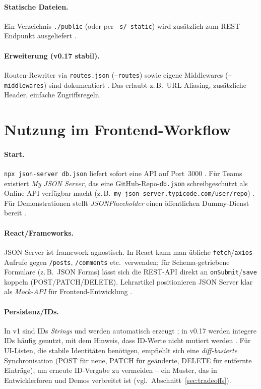 \documentclass[11pt,a4paper]{article}
\begin{document}
\paragraph{Statische Dateien.} Ein Verzeichnis \texttt{./public} (oder per \texttt{-s/--static}) wird zusätzlich zum REST-Endpunkt ausgeliefert \cite[Abschnitt \enquote{Serving static files}]{jsonserver-github-v1}. 

\paragraph{Erweiterung (v0.17 stabil).} Routen-Rewriter via \texttt{routes.json} (\texttt{--routes}) sowie eigene Middlewares (\texttt{--middlewares}) sind dokumentiert \cite[\enquote{Add custom routes}, \enquote{Add middlewares}]{jsonserver-github-v0}. Das erlaubt z.\,B.\ URL-Aliasing, zusätzliche Header, einfache Zugriffsregeln. 

\section{Nutzung im Frontend-Workflow}
\label{sec:workflow}
\paragraph{Start.} \texttt{npx json-server db.json} liefert sofort eine API auf Port~3000 \cite[Abschnitt \enquote{Usage}]{jsonserver-github-v1}. Für Teams existiert \emph{My JSON Server}, das eine GitHub-Repo-\texttt{db.json} schreibgeschützt als Online-API verfügbar macht (z.\,B.\ \texttt{my-json-server.typicode.com/user/repo}) \cite{my-json-server}. Für Demonstrationen stellt \emph{JSONPlaceholder} einen öffentlichen Dummy-Dienst bereit \cite{jsonplaceholder}.

\paragraph{React/Frameworks.} JSON Server ist framework-agnostisch. In React kann man übliche \texttt{fetch}/\texttt{axios}-Aufrufe gegen \texttt{/posts}, \texttt{/comments} etc.\ verwenden; für Schema-getriebene Formulare (z.\,B.\ JSON Forms) lässt sich die REST-API direkt an \texttt{onSubmit}/\texttt{save} koppeln (POST/PATCH/DELETE). Lehrartikel positionieren JSON Server klar als \emph{Mock-API} für Frontend-Entwicklung \cite{freecodecamp}.

\paragraph{Persistenz/IDs.} In v1 sind IDs \emph{Strings} und werden automatisch erzeugt \cite[Abschnitt \enquote{Notable differences with v0.17}]{jsonserver-github-v1}; in v0.17 werden integere IDs häufig genutzt, mit dem Hinweis, dass ID-Werte nicht mutiert werden \cite[v0-Hinweis]{jsonserver-github-v0}. Für UI-Listen, die stabile Identitäten benötigen, empfiehlt sich eine \emph{diff-basierte} Synchronisation (POST für neue, PATCH für geänderte, DELETE für entfernte Einträge), um erneute ID-Vergabe zu vermeiden -- ein Muster, das in Entwicklerforen und Demos verbreitet ist (vgl.\ Abschnitt~\ref{sec:tradeoffs}). 
\end{document}
